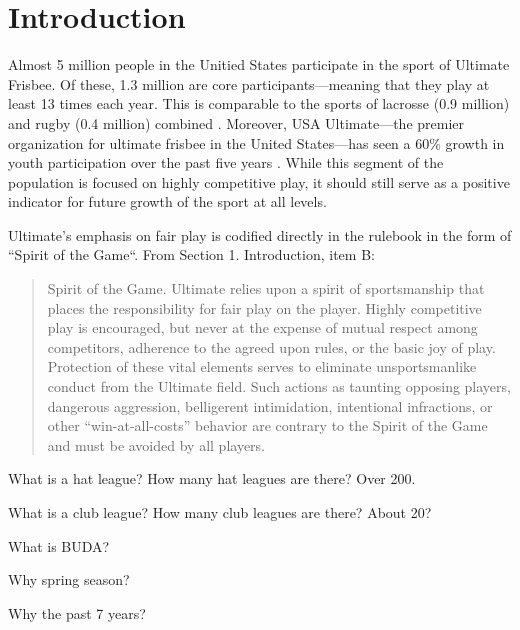 \section{Introduction}

Almost 5 million people in the Unitied States participate in the sport of Ultimate Frisbee.  Of these, 1.3 million are core participants---meaning that they play at least 13 times each year.  This is comparable to the sports of lacrosse (0.9 million) and rugby (0.4 million) combined \cite{sfia_2016}. Moreover, USA Ultimate---the premier organization for ultimate frisbee in the United States---has seen a 60\% growth in youth participation over the past five years \cite{usau_2016}.  While this segment of the population is focused on highly competitive play, it should still serve as a positive indicator for future growth of the sport at all levels.

Ultimate's emphasis on fair play is codified directly in the rulebook in the form of ``Spirit of the Game``.  From Section 1. Introduction, item B:

\begin{quote} Spirit of the Game. Ultimate relies upon a spirit of sportsmanship that places the responsibility for fair play on the player. Highly competitive play is encouraged, but never at the expense of mutual respect among competitors, adherence to the agreed upon rules, or the basic joy of play. Protection of these vital elements serves to eliminate unsportsmanlike conduct from the Ultimate field. Such actions as taunting opposing players, dangerous aggression, belligerent intimidation, intentional infractions, or other ``win-at-all-costs'' behavior are contrary to the Spirit of the Game and must be avoided by all players.
\end{quote}

What is a hat league?  How many hat leagues are there? Over 200.

What is a club league?  How many club leagues are there? About 20?

What is BUDA?

Why spring season?

Why the past 7 years?